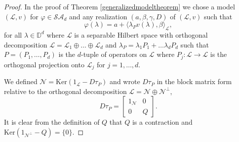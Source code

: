 \documentclass[11pt, reqno]{amsart}
\newcommand\1{\boldsymbol {1}}
\numberwithin{equation}{section}
\begin{document}
\begin{proof}
In the proof of Theorem \ref{generalizedmodeltheorem} we chose a  model $(\mathcal{L},v)$ for $\varphi\in\mathcal{SA}_{d}$ and any realization $(a,\beta,\gamma,D)$ of $(\mathcal{L},v)$ such that
\begin{equation}\label{realizationforphiinL}
\varphi(\lambda)=a+\langle\lambda_{P} v(\lambda),\beta\rangle_{\mathcal{L}},
\end{equation}
for all $\lambda\in\mathbb{D}^{d}$ where $\mathcal{L}$ is a separable Hilbert space with orthogonal decomposition $\mathcal{L} = \mathcal{L}_{1}\oplus \hdots \oplus \mathcal{L}_{d}$ and $\lambda_{P}=\lambda_{1}P_{1}+\hdots\lambda_{d}P_{d}$ such that $P=(P_{1},\hdots, P_{d})$ is the $d$-tuple of operators on $\mathcal{L}$ where $P_{j}:\mathcal{L}\rightarrow \mathcal{L}$ is the orthogonal projection onto $\mathcal{L}_{j}$ for $j=1,\hdots,d$.

 We defined $\mathcal{N}=\mathrm{Ker}(1_{\mathcal{L}}-D\tau_{P})$ and wrote $D\tau_{P}$ in the block matrix form relative to the orthogonal decomposition $\mathcal{L}=\mathcal{N}\oplus\mathcal{N}^{\perp}$,
\begin{equation}
    D\tau_{P} =\begin{bmatrix}
        1_{\mathcal{N}} & 0 \\
        0 & Q 
    \end{bmatrix}.
\end{equation}
It is clear from the definition of $Q$ that $Q$ is a contraction and $\mathrm{Ker}(1_{\mathcal{N}^{\perp}}-Q)=\{0\}$. 


\end{proof}
\end{document}
